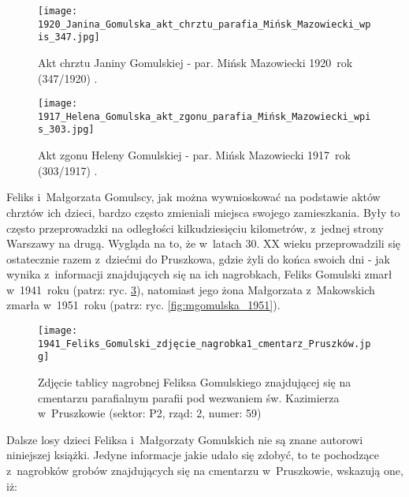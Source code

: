 \begin{figure}[!ht]
    \vspace*{0.5cm}
    \centering \texttt{[image: 
        1920\_Janina\_Gomulska\_akt\_chrztu\_parafia\_Mińsk\_Mazowiecki\_wpis\_347.jpg]}
    \captionsetup{format=hang}
    \caption{Akt chrztu Janiny Gomulskiej - par. Mińsk Mazowiecki 
    1920~rok (347/1920) 
    \cite{par_minsk2}.}
    \label{fig:jgomulska_1920}
\end{figure}

\begin{figure}[!ht]
    \vspace*{0.5cm}
    \centering \texttt{[image: 
        1917\_Helena\_Gomulska\_akt\_zgonu\_parafia\_Mińsk\_Mazowiecki\_wpis\_303.jpg]}
    \captionsetup{format=hang}
    \caption{Akt zgonu Heleny Gomulskiej - par. Mińsk Mazowiecki 
    1917~rok (303/1917) 
    \cite{par_minsk2}.}
    \label{fig:hgomulska_1917_2}
\end{figure}


Feliks i~Małgorzata Gomulscy, jak można wywnioskować na podstawie aktów 
chrztów ich dzieci, bardzo często zmieniali miejsca swojego zamieszkania. 
Były to często przeprowadzki na odległości kilkudziesięciu kilometrów, 
z~jednej strony Warszawy na drugą. Wygląda na to, że w~latach 30. XX wieku 
przeprowadzili się ostatecznie razem z~dziećmi do Pruszkowa, gdzie żyli do 
końca swoich dni - jak wynika z~informacji znajdujących się na ich nagrobkach, 
Feliks Gomulski zmarł w~1941~roku (patrz: ryc. \ref{fig:fgomulski_1941}), 
natomiast jego żona Małgorzata z~Makowskich zmarła w~1951~roku (patrz: ryc. 
\ref{fig:mgomulska_1951}).

\begin{figure}[!ht]
    \vspace*{0.5cm}
    \centering \texttt{[image: 
        1941\_Feliks\_Gomulski\_zdjęcie\_nagrobka1\_cmentarz\_Pruszków.jpg]}
    \captionsetup{format=hang}
    \caption{Zdjęcie tablicy nagrobnej Feliksa Gomulskiego znajdującej się na
    cmentarzu parafialnym parafii pod wezwaniem św. Kazimierza w~Pruszkowie 
    (sektor: P2, rząd: 2, numer: 59)}
    \label{fig:fgomulski_1941}
\end{figure}

Dalsze losy dzieci Feliksa i~Małgorzaty Gomulskich nie są znane autorowi 
niniejszej książki. Jedyne informacje jakie udało się zdobyć, to te 
pochodzące z~nagrobków grobów znajdujących się na cmentarzu w~Pruszkowie,  
wskazują one, iż:

